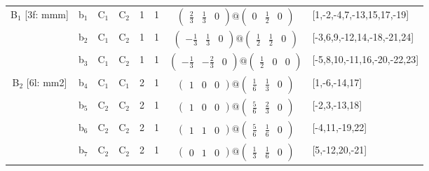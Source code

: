 \documentclass[fleqn,10pt,landscape]{article}
\begin{document}
\begin{itemize}
\begin{center}
\begin{longtable}{cc|cc|c|c|c|l}
B$_{1}$ [3f: mmm] & b$_{1}$ & C$_{1}$ & C$_{2}$ & 1 & 1 & $\begin{pmatrix} \frac{2}{3} & \frac{1}{3} & 0 \end{pmatrix}@\begin{pmatrix} 0 & \frac{1}{2} & 0 \end{pmatrix}$ & [1,-2,-4,7,-13,15,17,-19] \\
& b$_{2}$ & C$_{1}$ & C$_{2}$ & 1 & 1 & $\begin{pmatrix} - \frac{1}{3} & \frac{1}{3} & 0 \end{pmatrix}@\begin{pmatrix} \frac{1}{2} & \frac{1}{2} & 0 \end{pmatrix}$ & [-3,6,9,-12,14,-18,-21,24] \\
& b$_{3}$ & C$_{1}$ & C$_{2}$ & 1 & 1 & $\begin{pmatrix} - \frac{1}{3} & - \frac{2}{3} & 0 \end{pmatrix}@\begin{pmatrix} \frac{1}{2} & 0 & 0 \end{pmatrix}$ & [-5,8,10,-11,16,-20,-22,23] \\ \hline
B$_{2}$ [6l: mm2] & b$_{4}$ & C$_{1}$ & C$_{1}$ & 2 & 1 & $\begin{pmatrix} 1 & 0 & 0 \end{pmatrix}@\begin{pmatrix} \frac{1}{6} & \frac{1}{3} & 0 \end{pmatrix}$ & [1,-6,-14,17] \\
& b$_{5}$ & C$_{2}$ & C$_{2}$ & 2 & 1 & $\begin{pmatrix} 1 & 0 & 0 \end{pmatrix}@\begin{pmatrix} \frac{5}{6} & \frac{2}{3} & 0 \end{pmatrix}$ & [-2,3,-13,18] \\
& b$_{6}$ & C$_{2}$ & C$_{2}$ & 2 & 1 & $\begin{pmatrix} 1 & 1 & 0 \end{pmatrix}@\begin{pmatrix} \frac{5}{6} & \frac{1}{6} & 0 \end{pmatrix}$ & [-4,11,-19,22] \\
& b$_{7}$ & C$_{2}$ & C$_{2}$ & 2 & 1 & $\begin{pmatrix} 0 & 1 & 0 \end{pmatrix}@\begin{pmatrix} \frac{1}{3} & \frac{1}{6} & 0 \end{pmatrix}$ & [5,-12,20,-21] \\

\end{longtable}
\end{center}
\end{itemize}
\end{document}
